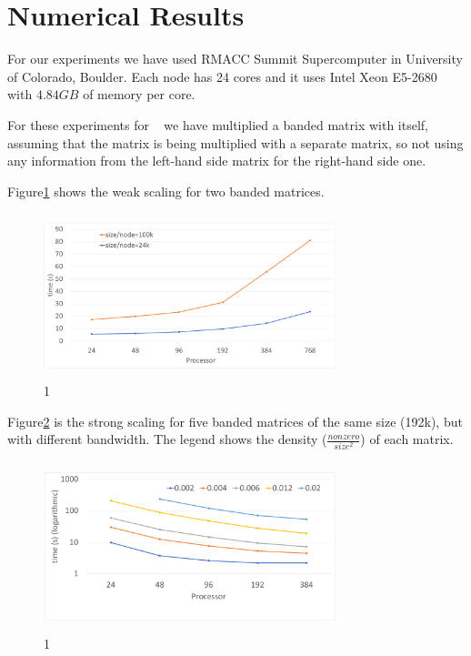 \section{Numerical Results}
\label{sec:results}

For our experiments we have used RMACC Summit Supercomputer in University of Colorado, Boulder. Each node has 24 cores and it uses Intel Xeon E5-2680 with $4.84GB$ of memory per core.

For these experiments for \mm~ we have multiplied a banded matrix with itself, assuming that the matrix is being multiplied with a separate matrix, so not using any information from the left-hand side matrix for the right-hand side one.

Figure\ref{fig:weak1} shows the weak scaling for two banded matrices.

\begin{figure}[tbh]
 \centering
 \includegraphics[width=8.5cm,height=4.8cm]{./figures/weak1.pdf}
 \caption{1}
 \label{fig:weak1}
\end{figure}

Figure\ref{fig:strong1} is the strong scaling for five banded matrices of the same size (192k), but with different bandwidth. The legend shows the density ($\frac{nonzero}{size^2}$) of each matrix.

\begin{figure}[tbh]
 \centering
 \includegraphics[width=8.5cm,height=4.9cm]{./figures/strong1.pdf}
 \caption{1}
 \label{fig:strong1}
\end{figure}


